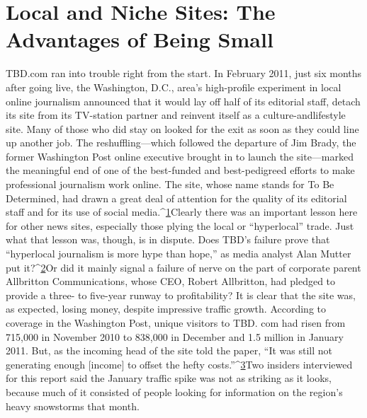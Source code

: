 
\chapter{Local and Niche Sites: The Advantages of Being Small}
TBD.com ran into trouble right from the start. In February 2011, just six
months after going live, the Washington, D.C., area's high-profile experiment in
local online journalism announced that it would lay off half of its editorial staff,
detach its site from its TV-station partner and reinvent itself as a culture-andlifestyle
site. Many of those who did stay on looked for the exit as soon as they
could line up another job.
The reshuffling—which followed the departure of Jim Brady, the former
Washington Post online executive brought in to launch the site—marked the
meaningful end of one of the best-funded and best-pedigreed efforts to make
professional journalism work online. The site, whose name stands for To Be Determined,
had drawn a great deal of attention for the quality of its editorial staff
and for its use of social media.^{\href{#endnotes-chapter-3}{1}}Clearly there was an important lesson here for
other news sites, especially those plying the local or ``hyperlocal'' trade.
Just what that lesson was, though, is in dispute. Does TBD's failure prove that
``hyperlocal journalism is more hype than hope,'' as media analyst Alan Mutter
put it?^{\href{#endnotes-chapter-3}{2}}Or did it mainly signal a failure of nerve on the part of corporate parent
Allbritton Communications, whose CEO, Robert Allbritton, had pledged to
provide a three- to five-year runway to profitability?
It is clear that the site was, as expected, losing money, despite impressive traffic
growth. According to coverage in the Washington Post, unique visitors to TBD.
com had risen from 715,000 in November 2010 to 838,000 in December and
1.5 million in January 2011. But, as the incoming head of the site told the paper,
``It was still not generating enough [income] to offset the hefty costs.''^{\href{#endnotes-chapter-3}{3}}Two insiders
interviewed for this report said the January traffic spike was not as striking
as it looks, because much of it consisted of people looking for information on the
region's heavy snowstorms that month.

